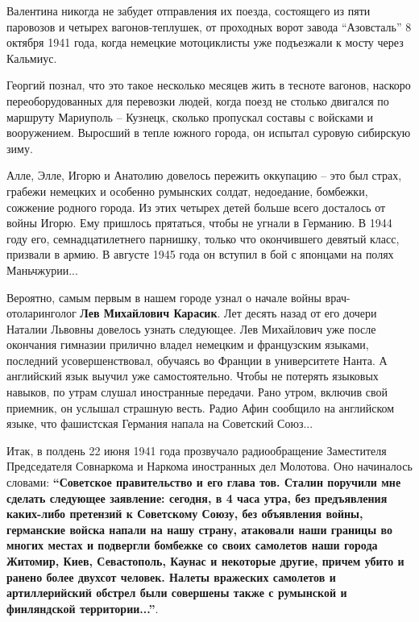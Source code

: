 Валентина никогда не забудет отправления их поезда, состоящего из пяти
паровозов и четырех вагонов-теплушек, от проходных ворот завода \enquote{Азовсталь} 8
октября 1941 года, когда немецкие мотоциклисты уже подъезжали к мосту через
Кальмиус. 

Георгий познал, что это такое несколько месяцев жить в тесноте вагонов, наскоро
переоборудованных для перевозки людей, когда поезд не столько двигался по
маршруту Мариуполь – Кузнецк, сколько пропускал составы с войсками и
вооружением. Выросший в тепле южного города, он испытал суровую сибирскую зиму.

Алле, Элле, Игорю и Анатолию довелось пережить оккупацию – это был страх,
грабежи немецких и особенно румынских солдат, недоедание, бомбежки, сожжение
родного города. Из этих четырех детей больше всего досталось от войны Игорю.
Ему пришлось прятаться, чтобы не угнали в Германию. В 1944 году его,
семнадцатилетнего парнишку, только что окончившего девятый класс, призвали в
армию. В августе 1945 года он вступил в бой с японцами на полях Маньчжурии...

Вероятно, самым первым в нашем городе узнал о начале войны врач-отоларинголог
\textbf{Лев Михайлович Карасик}. Лет десять назад от его дочери Наталии Львовны довелось
узнать следующее. Лев Михайлович уже после окончания гимназии прилично владел
немецким и французским языками, последний усовершенствовал, обучаясь во Франции
в университете Нанта. А английский язык выучил уже самостоятельно. Чтобы не
потерять языковых навыков, по утрам слушал иностранные передачи. Рано утром,
включив свой приемник, он услышал страшную весть. Радио Афин сообщило на
английском языке, что фашистская Германия напала на Советский Союз...

Итак, в полдень 22 июня 1941 года прозвучало радиообращение Заместителя
Председателя Совнаркома и Наркома иностранных дел Молотова. Оно начиналось
словами: \textbf{\enquote{Советское правительство и его глава тов. Сталин поручили мне
сделать следующее заявление: сегодня, в 4 часа утра, без предъявления
каких-либо претензий к Советскому Союзу, без объявления войны, германские
войска напали на нашу страну, атаковали наши границы во многих местах и
подвергли бомбежке со своих самолетов наши города Житомир, Киев, Севастополь,
Каунас и некоторые другие, причем убито и ранено более двухсот человек. Налеты
вражеских самолетов и артиллерийский обстрел были совершены также с румынской и
финляндской территории...}}. 

